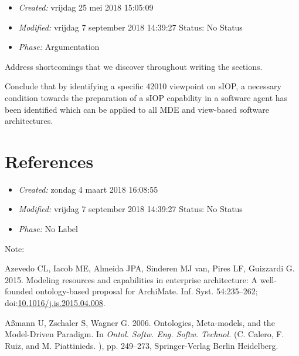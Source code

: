 \documentclass[a4paper,11pt,oneside,oldfontcommands]{memoir}
\newcounter{para}
\theoremstyle{definition}
\theoremstyle{break}		%
\numberwithin{equation}{chapter}
\numberwithin{figure}{chapter}
\begin{document}
\begin{itemize}
\tightlist
\item
  \emph{Created:} vrijdag 25 mei 2018 15:05:09
\item
  \emph{Modified:} vrijdag 7 september 2018 14:39:27 Status: No Status
\item
  \emph{Phase:} Argumentation
\end{itemize}

\begin{synopsis}
Address shortcomings that we discover throughout writing the sections. 

Conclude that by identifying a specific 42010 viewpoint on sIOP, a necessary condition towards the preparation of a sIOP capability in a software agent has been identified which can be applied to all MDE and view-based software architectures.

\end{synopsis}

\hypertarget{references}{%
\chapter*{References}\label{references}}

\begin{itemize}
\tightlist
\item
  \emph{Created:} zondag 4 maart 2018 16:08:55
\item
  \emph{Modified:} vrijdag 7 september 2018 14:39:27 Status: No Status
\item
  \emph{Phase:} No Label
\end{itemize}

\setlength{\parindent}{-0.2in}

\setlength{\leftskip}{0.2in}

\setlength{\parskip}{8pt}

Note:

\hypertarget{refs}{}
\leavevmode\hypertarget{ref-Azevedo2015}{}%
Azevedo CL, Iacob ME, Almeida JPA, Sinderen MJ van, Pires LF, Guizzardi
G. 2015. Modeling resources and capabilities in enterprise architecture:
A well-founded ontology-based proposal for ArchiMate. Inf. Syst.
54:235--262;
doi:\href{https://doi.org/10.1016/j.is.2015.04.008}{10.1016/j.is.2015.04.008}.

\leavevmode\hypertarget{ref-Auxdfmann2006}{}%
Aßmann U, Zschaler S, Wagner G. 2006. Ontologies, Meta-models, and the
Model-Driven Paradigm. In \emph{Ontol. Softw. Eng. Softw. Technol.} (C.
Calero, F. Ruiz, and M. Piattinieds. ), pp. 249--273, Springer-Verlag
Berlin Heidelberg.
\end{document}
